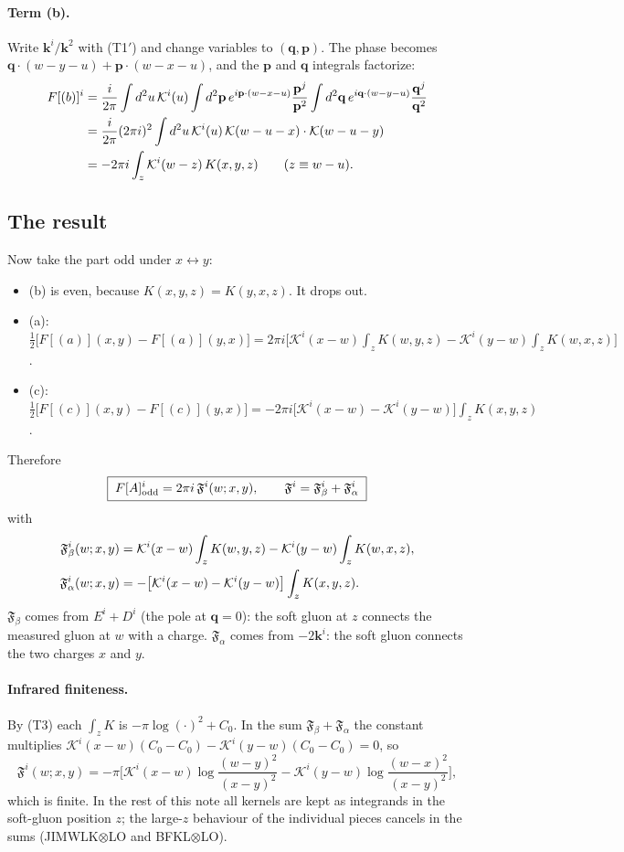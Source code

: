 \documentclass[10pt]{article}
\numberwithin{equation}{section}
\newcommand{\KK}{\mathcal K}
\newcommand{\bk}{\mathbf k}
\newcommand{\bp}{\mathbf p}
\newcommand{\bq}{\mathbf q}
\begin{document}
\paragraph{Term (b).} Write $\bk^i/\bk^2$ with (T1$'$) and change variables to $(\bq,\bp)$. The phase becomes $\bq\cdot(w-y-u)+\bp\cdot(w-x-u)$, and the $\bp$ and $\bq$ integrals factorize:
\begin{align}
F[(b)]^i&=\frac{i}{2\pi}\int d^2u\,\KK^i(u)\int d^2\bp\,e^{i\bp\cdot(w-x-u)}\frac{\bp^j}{\bp^2}\int d^2\bq\,e^{i\bq\cdot(w-y-u)}\frac{\bq^j}{\bq^2}\notag\\
&=\frac{i}{2\pi}(2\pi i)^2\int d^2u\,\KK^i(u)\,\KK(w-u-x)\cdot\KK(w-u-y)\notag\\
&=-2\pi i\int_z\KK^i(w-z)\,K(x,y,z)\qquad(z\equiv w-u).
\end{align}

\subsection{The result}\label{sec:ft-result}
Now take the part odd under $x\leftrightarrow y$:
\begin{itemize}
\item (b) is even, because $K(x,y,z)=K(y,x,z)$. It drops out.
\item (a): $\frac12\big[F[(a)](x,y)-F[(a)](y,x)\big]=2\pi i\big[\KK^i(x-w)\int_zK(w,y,z)-\KK^i(y-w)\int_zK(w,x,z)\big]$.
\item (c): $\frac12\big[F[(c)](x,y)-F[(c)](y,x)\big]=-2\pi i\big[\KK^i(x-w)-\KK^i(y-w)\big]\int_zK(x,y,z)$.
\end{itemize}
Therefore
\begin{equation}
\boxed{\;F[A]^i_{\rm odd}=2\pi i\,\mathfrak F^i(w;x,y),\qquad \mathfrak F^i=\mathfrak F^i_\beta+\mathfrak F^i_\alpha\;}
\label{eq:Fresult}
\end{equation}
with
\begin{align}
\mathfrak F^i_\beta(w;x,y)&=\KK^i(x-w)\int_zK(w,y,z)-\KK^i(y-w)\int_zK(w,x,z),\notag\\
\mathfrak F^i_\alpha(w;x,y)&=-\big[\KK^i(x-w)-\KK^i(y-w)\big]\int_zK(x,y,z).
\label{eq:Fab}
\end{align}
$\mathfrak F_\beta$ comes from $E^i+D^i$ (the pole at $\bq=0$): the soft gluon at $z$ connects the measured gluon at $w$ with a charge. $\mathfrak F_\alpha$ comes from $-2\bk^i$: the soft gluon connects the two charges $x$ and $y$.
\paragraph{Infrared finiteness.} By (T3) each $\int_zK$ is $-\pi\log(\cdot)^2+C_0$. In the sum $\mathfrak F_\beta+\mathfrak F_\alpha$ the constant multiplies $\KK^i(x-w)(C_0-C_0)-\KK^i(y-w)(C_0-C_0)=0$, so
\begin{equation}
\mathfrak F^i(w;x,y)=-\pi\Big[\KK^i(x-w)\log\frac{(w-y)^2}{(x-y)^2}-\KK^i(y-w)\log\frac{(w-x)^2}{(x-y)^2}\Big],
\label{eq:Flog}
\end{equation}
which is finite. In the rest of this note all kernels are kept as integrands in the soft-gluon position $z$; the large-$z$ behaviour of the individual pieces cancels in the sums (JIMWLK$\otimes$LO and BFKL$\otimes$LO).
\end{document}
